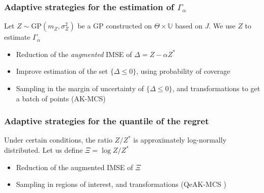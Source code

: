 \documentclass[11pt]{beamer}
\DeclareMathOperator*{\argmax}{arg\,max}
\newcommand{\kk}{\theta}
\newcommand{\Uspace}{\mathbb{U}}
\newcommand{\Kspace}{\Theta}
\begin{document}



\begin{frame}[t]
  \frametitle{Adaptive strategies for the estimation of $\Gamma_{\alpha}$}
  Let $Z \sim \mathrm{GP}(m_Z, \sigma_Z^2)$ be a GP constructed on $\Kspace \times \Uspace$ based on $J$.
  We use $Z$ to estimate $\Gamma_{\alpha}$

  \begin{itemize}
  \item Reduction of the \emph{augmented} IMSE of $\Delta = Z - \alpha Z^*$
  \item Improve estimation of the set $\{\Delta \leq 0\}$, using probability of coverage
  \end{itemize}
  \begin{itemize}
  \item Sampling in the margin of uncertainty of $\{\Delta \leq 0\}$,
    and transformations to get a batch of points (AK-MCS)
  \end{itemize}
\end{frame}

\begin{frame}
  \frametitle{Adaptive strategies for the quantile of the regret}
  Under certain conditions, the ratio $Z/Z^*$ is approximately
  log-normally distributed.  Let us define $\Xi = \log Z/ Z^*$

  \begin{itemize}
  \item Reduction of the augmented IMSE of $\Xi$
  \end{itemize}
  \begin{itemize}
  \item Sampling in regions of interest, and transformations (QeAK-MCS \citep{razaaly_rare_2019})
  \end{itemize}
\end{frame}
\end{document}
